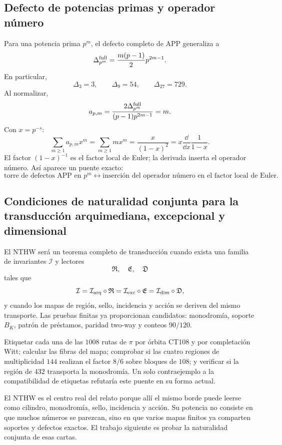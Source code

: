 \subsection{Defecto de potencias primas y operador número}

Para una potencia prima \(p^m\), el defecto completo de APP generaliza a
\[
\Delta_{p^m}^{\rm full}
=\frac{m(p-1)}2p^{2m-1}.
\]
En particular,
\[
\Delta_3=3,
\qquad
\Delta_9=54,
\qquad
\Delta_{27}=729.
\]
Al normalizar,
\[
a_{p,m}
=\frac{2\Delta_{p^m}^{\rm full}}{(p-1)p^{2m-1}}
=m.
\]
Con \(x=p^{-s}\):
\[
\sum_{m\ge1}a_{p,m}x^m
=\sum_{m\ge1}mx^m
=\frac{x}{(1-x)^2}
=x\frac{\dd}{\dd x}\frac1{1-x}.
\]
El factor \((1-x)^{-1}\) es el factor local de Euler; la derivada inserta el
operador número. Así aparece un puente exacto:
\[
\boxed{
\text{torre de defectos APP en }p^m
\longleftrightarrow
\text{inserción del operador número en el factor local de Euler}.}
\]

\subsection{Condiciones de naturalidad conjunta para la transducción arquimediana, excepcional y dimensional}

El NTHW será un teorema completo de transducción cuando exista una familia de
invariantes \(\mathcal I\) y lectores
\[
\mathfrak R,\quad\mathfrak E,\quad\mathfrak D
\]
tales que
\[
\mathcal I
=\mathcal I_{\rm arq}\circ\mathfrak R
=\mathcal I_{\rm exc}\circ\mathfrak E
=\mathcal I_{\rm dim}\circ\mathfrak D,
\]
y cuando los mapas de región, sello, incidencia y acción se deriven del mismo
transporte. Las pruebas finitas ya proporcionan candidatos: monodromía,
soporte \(B_K\), patrón de préstamos, paridad two-way y conteos \(90/120\).

\begin{programbox}[title={Prueba ejecutable 108--144--90--120}]
Etiquetar cada una de las \(1008\) rutas de \(\pi\) por órbita CT108 y por
completación Witt; calcular las fibras del mapa; comprobar si las cuatro
regiones de multiplicidad \(144\) realizan el factor \(8/6\) sobre bloques
de \(108\); y verificar si la región de \(432\) transporta la monodromía. Un
solo contraejemplo a la compatibilidad de etiquetas refutaría este puente en
su forma actual.
\end{programbox}

\begin{takeawaybox}
El NTHW es el centro real del relato porque allí el mismo borde puede leerse
como cilindro, monodromía, sello, incidencia y acción. Su potencia no consiste
en que muchos números se parezcan, sino en que varios mapas finitos ya
comparten soportes y defectos exactos. El trabajo siguiente es probar la
naturalidad conjunta de esas cartas.
\end{takeawaybox}


